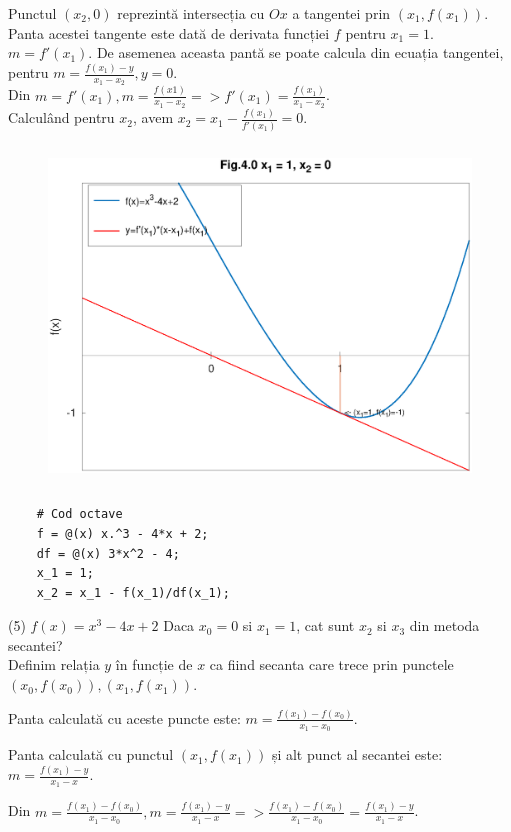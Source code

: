 \documentclass[12pt]{article}
\begin{document}
Punctul $(x_2,0)$ reprezintă intersecția cu $Ox$ a tangentei prin $(x_1,f(x_1))$.
Panta acestei tangente este dată de derivata funcției $f$ pentru $x_1=1$.
$m=f'(x_1)$. De asemenea aceasta pantă se poate calcula din ecuația tangentei,
pentru $m=\frac{f(x_1)-y}{x_1-x_2}, y=0$.\\
Din $m=f'(x_1), m=\frac{f(x1)}{x_1-x_2} => f'(x_1)=\frac{f(x_1)}{x_1-x_2}$.\\
Calculând pentru $x_2$, avem $x_2=x_1-\frac{f(x_1)}{f'(x_1)}=0$.
\begin{figure}[htbp]
    \begin{center}
        \includegraphics[height=90mm]{octave-fig/Fig.4.0.eps}
    \end{center}
\end{figure}
\begin{verbatim}
    # Cod octave
    f = @(x) x.^3 - 4*x + 2;
    df = @(x) 3*x^2 - 4;
    x_1 = 1;
    x_2 = x_1 - f(x_1)/df(x_1);
\end{verbatim}
\newpage

(5) $f(x)=x^3-4x+2$ Daca $x_0=0$ si $x_1=1$, cat sunt $x_2$ si $x_3$ din metoda secantei?\\
Definim relația $y$ în funcție de $x$ ca fiind secanta care trece prin punctele $(x_0, f(x_0)), (x_1, f(x_1))$.

Panta calculată cu aceste puncte este: $m=\frac{f(x_1)-f(x_0)}{x_1-x_0}$.

Panta calculată cu punctul $(x_1, f(x_1))$ și alt punct al secantei este:
$m=\frac{f(x_1)-y}{x_1-x}$. 

Din
$m=\frac{f(x_1)-f(x_0)}{x_1-x_0}, m=\frac{f(x_1)-y}{x_1-x} =>\frac{f(x_1)-f(x_0)}{x_1-x_0} = \frac{f(x_1)-y}{x_1-x}$.
\end{document}
